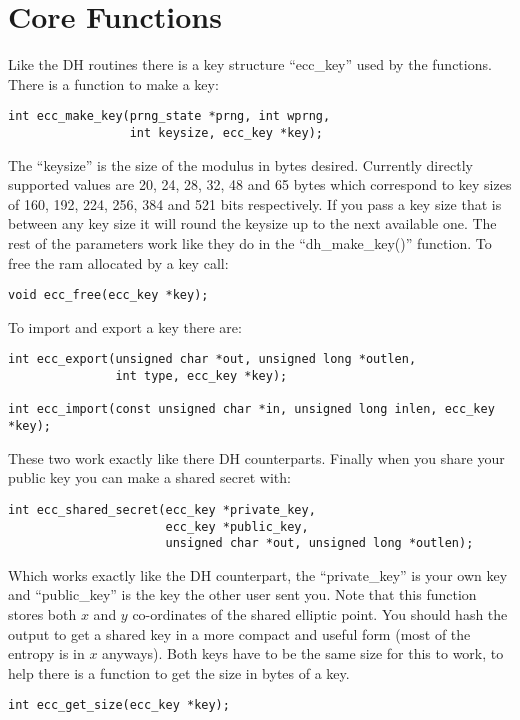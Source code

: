 \documentclass{book}
\begin{document}
\section{Core Functions}

Like the DH routines there is a key structure ``ecc\_key'' used by the functions.  There is a function to make a key:
\begin{verbatim}
int ecc_make_key(prng_state *prng, int wprng, 
                 int keysize, ecc_key *key);
\end{verbatim}

The ``keysize'' is the size of the modulus in bytes desired.  Currently directly supported values are 20, 24, 28, 32, 48 and 65 bytes which
correspond to key sizes of 160, 192, 224, 256, 384 and 521 bits respectively.  If you pass a key size that is between any key size
it will round the keysize up to the next available one.  The rest of the parameters work like they do in the ``dh\_make\_key()'' function.  
To free the ram allocated by a key call:
\begin{verbatim}
void ecc_free(ecc_key *key);
\end{verbatim}

To import and export a key there are: 
\begin{verbatim}
int ecc_export(unsigned char *out, unsigned long *outlen, 
               int type, ecc_key *key);

int ecc_import(const unsigned char *in, unsigned long inlen, ecc_key *key);
\end{verbatim}
These two work exactly like there DH counterparts.  Finally when you share your public key you can make a shared secret
with:
\begin{verbatim}
int ecc_shared_secret(ecc_key *private_key, 
                      ecc_key *public_key, 
                      unsigned char *out, unsigned long *outlen);
\end{verbatim}
Which works exactly like the DH counterpart, the ``private\_key'' is your own key and ``public\_key'' is the key the other
user sent you.   Note that this function stores both $x$ and $y$ co-ordinates of the shared
elliptic point.  You should hash the output to get a shared key in a more compact and useful form (most of the entropy is 
in $x$ anyways).  Both keys have to be the same size for this to work, to help there is a function to get the size in bytes
 of a key.
\begin{verbatim}
int ecc_get_size(ecc_key *key);
\end{verbatim}
\end{document}
